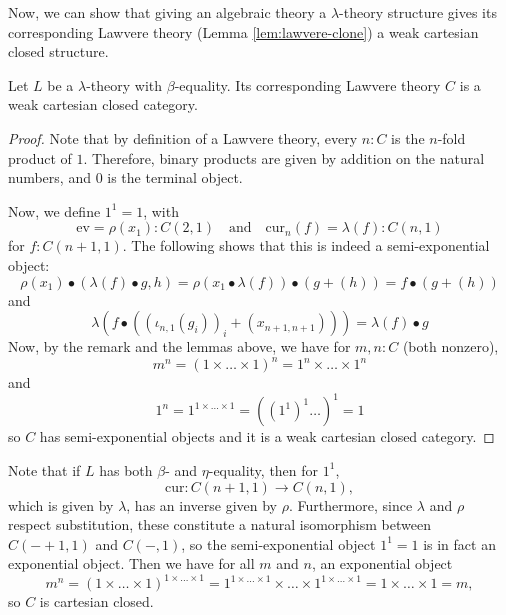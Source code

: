 Now, we can show that giving an algebraic theory a $ \lambda $-theory structure gives its corresponding Lawvere theory (Lemma \ref{lem:lawvere-clone}) a weak cartesian closed structure.
\begin{lemma}
  Let $ L $ be a $ \lambda $-theory with $ \beta $-equality. Its corresponding Lawvere theory $ C $ is a weak cartesian closed category.
\end{lemma}
\begin{proof}
  Note that by definition of a Lawvere theory, every $ n: C $ is the $ n $-fold product of $ 1 $. Therefore, binary products are given by addition on the natural numbers, and $ 0 $ is the terminal object.

  Now, we define $ 1^1 = 1 $, with
  \[ \mathrm{ev} = \rho(x_1) : C(2, 1) \quad \text{and} \quad \mathrm{cur}_n(f) = \lambda(f) : C(n, 1) \]
  for $ f: C(n + 1, 1) $. The following shows that this is indeed a semi-exponential object:
  \[ \rho(x_1) \bullet (\lambda(f) \bullet g, h) = \rho(x_1 \bullet \lambda(f)) \bullet (g + (h)) = f \bullet (g + (h)) \]
  and
  \[ \lambda(f \bullet ((\iota_{n, 1}(g_i))_i + (x_{n + 1, n + 1}))) = \lambda(f) \bullet g \]
  Now, by the remark and the lemmas above, we have for $ m, n: C $ (both nonzero),
  \[ m^n = (1 \times \dots \times 1)^n = 1^n \times \dots \times 1^n \]
  and
  \[ 1^n = 1^{1 \times \dots \times 1} = ((1^1)^1\dots)^1 = 1 \]
  so $ C $ has semi-exponential objects and it is a weak cartesian closed category.
\end{proof}

\begin{remark}
  Note that if $ L $ has both $ \beta $- and $ \eta $-equality, then for $ 1^1 $,
  \[ \mathrm{cur}: C(n + 1, 1) \to C(n, 1), \]
  which is given by $ \lambda $, has an inverse given by $ \rho $. Furthermore, since $ \lambda $ and $ \rho $ respect substitution, these constitute a natural isomorphism between $ C(- + 1, 1) $ and $ C(-, 1) $, so the semi-exponential object $ 1^1 = 1 $ is in fact an exponential object. Then we have for all $ m $ and $ n $, an exponential object
  \[ m^n = (1 \times \dots \times 1)^{1 \times \dots \times 1} = 1^{1 \times \dots \times 1} \times \dots \times 1^{1 \times \dots \times 1} = 1 \times \dots \times 1 = m, \]
  so $ C $ is cartesian closed.
\end{remark}
